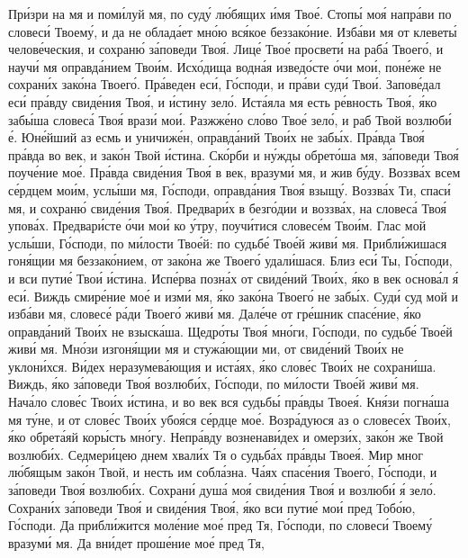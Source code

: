 \begin{mymulticols}
Пр\'{и}зри на мя и пом\'{и}луй мя, по суд\'{у} л\'{ю}бящих \'{и}мя Тво\'{е}. Стоп\'{ы} мо\'{я} напр\'{а}ви по словес\'{и} Твоем\'{у}, и да не облад\'{а}ет мн\'{о}ю вс\'{я}кое беззак\'{о}ние. Изб\'{а}ви мя от клевет\'{ы} челов\'{е}ческия, и сохран\'{ю} з\'{а}поведи Тво\'{я}. Лиц\'{е} Тво\'{е} просвет\'{и} на раб\'{а} Твоег\'{о}, и науч\'{и} мя оправд\'{а}нием Тво\'{и}м. Исх\'{о}дища водн\'{а}я извед\'{о}сте \'{о}чи мо\'{и}, пон\'{е}же не сохран\'{и}х зак\'{о}на Твоег\'{о}. Пр\'{а}веден ес\'{и}, Г\'{о}споди, и пр\'{а}ви суд\'{и} Тво\'{и}. Запов\'{е}дал ес\'{и} пр\'{а}вду свид\'{е}ния Тво\'{я}, и \'{и}стину зел\'{о}. Ист\'{а}яла мя есть р\'{е}вность Тво\'{я}, \'{я}ко заб\'{ы}ша словес\'{а} Тво\'{я} враз\'{и} мо\'{и}. Разжж\'{е}но сл\'{о}во Тво\'{е} зел\'{о}, и раб Твой возлюб\'{и} \'{е}. Юн\'{е}йший аз есмь и уничиж\'{е}н, оправд\'{а}ний Тво\'{и}х не заб\'{ы}х. Пр\'{а}вда Тво\'{я} пр\'{а}вда во век, и зак\'{о}н Твой \'{и}стина. Ск\'{о}рби и н\'{у}жды обрет\'{о}ша мя, з\'{а}поведи Тво\'{я} поуч\'{е}ние мо\'{е}. Пр\'{а}вда свид\'{е}ния Тво\'{я} в век, вразум\'{и} мя, и жив б\'{у}ду. Воззв\'{а}х всем с\'{е}рдцем мо\'{и}м, усл\'{ы}ши мя, Г\'{о}споди, оправд\'{а}ния Тво\'{я} взыщ\'{у}. Воззв\'{а}х Ти, спас\'{и} мя, и сохран\'{ю} свид\'{е}ния Тво\'{я}. Предвар\'{и}х в безг\'{о}дии и воззв\'{а}х, на словес\'{а} Тво\'{я} упов\'{а}х. Предвар\'{и}сте \'{о}чи мо\'{и} ко \'{у}тру, поуч\'{и}тися словес\'{е}м Тво\'{и}м. Глас мой усл\'{ы}ши, Г\'{о}споди, по м\'{и}лости Тво\'{е}й: по судьб\'{е} Тво\'{е}й жив\'{и} мя. Прибл\'{и}жишася гон\'{я}щии мя беззак\'{о}нием, от зак\'{о}на же Твоег\'{о} удал\'{и}шася. Близ ес\'{и} Ты, Г\'{о}споди, и вси пути\'{е} Тво\'{и} \'{и}стина. Исп\'{е}рва позн\'{а}х от свид\'{е}ний Тво\'{и}х, \'{я}ко в век основ\'{а}л \'{я} ес\'{и}. Виждь смир\'{е}ние мо\'{е} и изм\'{и} мя, \'{я}ко зак\'{о}на Твоег\'{о} не заб\'{ы}х. Суд\'{и} суд мой и изб\'{а}ви мя, словес\'{е} р\'{а}ди Твоег\'{о} жив\'{и} мя. Дал\'{е}че от гр\'{е}шник спас\'{е}ние, \'{я}ко оправд\'{а}ний Тво\'{и}х не взыск\'{а}ша. Щедр\'{о}ты Тво\'{я} мн\'{о}ги, Г\'{о}споди, по судьб\'{е} Тво\'{е}й жив\'{и} мя. Мн\'{о}зи изгон\'{я}щии мя и стуж\'{а}ющии ми, от свид\'{е}ний Тво\'{и}х не уклон\'{и}хся. В\'{и}дех неразумев\'{а}ющия и ист\'{а}ях, \'{я}ко слов\'{е}с Тво\'{и}х не сохран\'{и}ша. Виждь, \'{я}ко з\'{а}поведи Тво\'{я} возлюб\'{и}х, Г\'{о}споди, по м\'{и}лости Тво\'{е}й жив\'{и} мя. Нач\'{а}ло слов\'{е}с Тво\'{и}х \'{и}стина, и во век вся судьб\'{ы} пр\'{а}вды Твое\'{я}. Кн\'{я}зи погн\'{а}ша мя т\'{у}не, и от слов\'{е}с Тво\'{и}х убо\'{я}ся с\'{е}рдце мо\'{е}. Возр\'{а}дуюся аз о словес\'{е}х Тво\'{и}х, \'{я}ко обрет\'{а}яй кор\'{ы}сть мн\'{о}гу. Непр\'{а}вду возненав\'{и}дех и омерз\'{и}х, зак\'{о}н же Твой возлюб\'{и}х. Седмер\'{и}цею днем хвал\'{и}х Тя о судьб\'{а}х пр\'{а}вды Твое\'{я}. Мир мног л\'{ю}бящым зак\'{о}н Твой, и несть им собл\'{а}зна. Ч\'{а}ях спас\'{е}ния Твоег\'{о}, Г\'{о}споди, и з\'{а}поведи Тво\'{я} возлюб\'{и}х. Сохран\'{и} душ\'{а} мо\'{я} свид\'{е}ния Тво\'{я} и возлюб\'{и} \'{я} зел\'{о}. Сохран\'{и}х з\'{а}поведи Тво\'{я} и свид\'{е}ния Тво\'{я}, \'{я}ко вси пути\'{е} мо\'{и} пред Тоб\'{о}ю, Г\'{о}споди. Да прибл\'{и}жится мол\'{е}ние мо\'{е} пред Тя, Г\'{о}споди, по словес\'{и} Твоем\'{у} вразум\'{и} мя. Да вн\'{и}дет прош\'{е}ние мо\'{е} пред Тя, 
\end{mymulticols}
